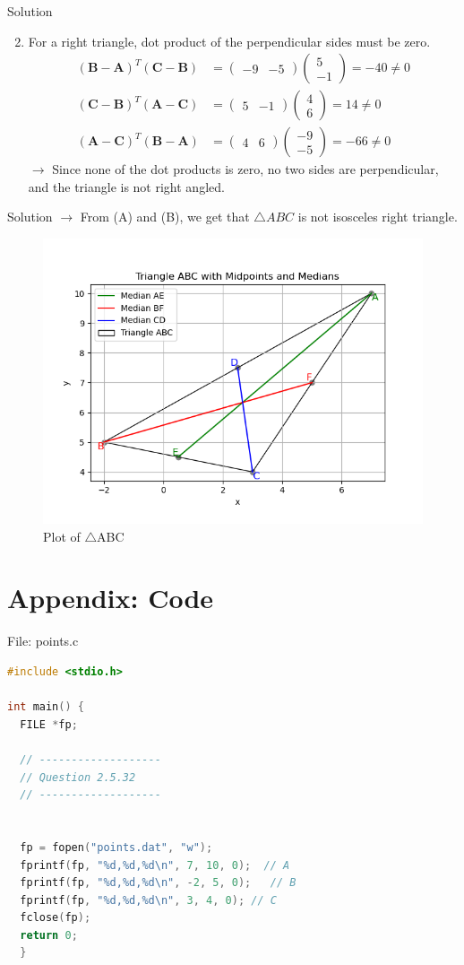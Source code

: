 \documentclass{beamer}
\numberwithin{equation}{section}
\theoremstyle{remark}
\newcommand{\myvec}[1]{\ensuremath{\begin{pmatrix}#1\end{pmatrix}}}
\let\vec\mathbf
\begin{document}
\begin{frame}{Solution}
\begin{enumerate}[label=(\Alph*)]\setcounter{enumi}{1}
\item {
For a right triangle, dot product of the perpendicular sides must be zero.
\begin{align}
    (\vec{B}-\vec{A})^T(\vec{C}-\vec{B})&=\myvec{-9&-5}\myvec{5\\-1} = -40 \neq 0 \\
    (\vec{C}-\vec{B})^T(\vec{A}-\vec{C})&=\myvec{5&-1}\myvec{4\\6} = 14 \neq 0 \\
    (\vec{A}-\vec{C})^T(\vec{B}-\vec{A})&=\myvec{4&6}\myvec{-9\\-5} = -66 \neq 0
\end{align}
$\rightarrow$ Since none of the dot products is zero, no two sides are perpendicular, and the triangle is not right angled.
}
\end{enumerate}
\end{frame}

\begin{frame}{Solution}
$\longrightarrow$ From (A) and (B), we get that $\triangle ABC$ is not isosceles right triangle.
\begin{figure}[h!]
   \centering
   \includegraphics[width=0.75\linewidth]{figs/01.png}
   \caption{Plot of $\triangle$ABC}
   \label{Plot_1}
\end{figure}
\end{frame}

\section*{Appendix: Code}

\begin{frame}[fragile]{File: points.c}
\begin{lstlisting}[language=C]
#include <stdio.h>

int main() {
  FILE *fp;

  // -------------------
  // Question 2.5.32
  // -------------------


  fp = fopen("points.dat", "w");
  fprintf(fp, "%d,%d,%d\n", 7, 10, 0);  // A
  fprintf(fp, "%d,%d,%d\n", -2, 5, 0);   // B
  fprintf(fp, "%d,%d,%d\n", 3, 4, 0); // C
  fclose(fp);
  return 0;
  }
\end{lstlisting}
\end{frame}
\end{document}
